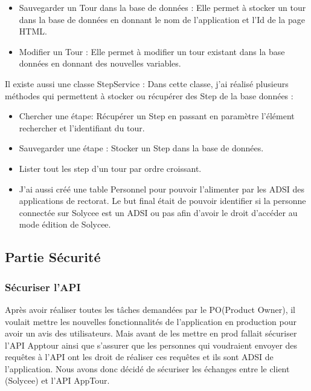 \documentclass[12pt]{article}
\begin{document}
\begin{itemize}
\begin{itemize}
\item Sauvegarder un Tour dans la base de données : Elle permet à stocker un tour dans la base de données en donnant le nom de l'application et l'Id de la page HTML. 

\item Modifier un Tour : Elle permet à modifier un tour existant dans la base données en donnant des nouvelles variables. 
\end{itemize}

Il existe aussi une classe StepService : Dans cette classe, j'ai réalisé plusieurs méthodes qui permettent à stocker ou récupérer des Step de la base données : 
\begin{itemize}

\item  Chercher une étape: Récupérer un Step en passant en paramètre l'élément rechercher et l'identifiant du tour.

\item Sauvegarder une étape : Stocker un Step dans la base de données.

\item Lister tout les step d'un tour par ordre croissant.  


\item J'ai aussi créé une table Personnel pour pouvoir l'alimenter par les ADSI des applications de rectorat. Le but final était de pouvoir identifier si la personne connectée sur Solycee est un ADSI ou pas afin d'avoir le droit d'accéder au mode édition de Solycee. 

\end{itemize}
\end{itemize}
\subsection{Partie Sécurité}

\subsubsection{Sécuriser l'API}

Après avoir réaliser toutes les tâches demandées par le PO(Product Owner), il voulait mettre les nouvelles fonctionnalités de l'application en production pour avoir un avis des utilisateurs. Mais avant de les mettre en prod fallait sécuriser l'API Apptour ainsi que s'assurer que les personnes qui voudraient envoyer des requêtes à l'API ont les droit de réaliser ces requêtes et ils sont ADSI de l'application. Nous avons donc décidé de sécuriser les échanges entre le client (Solycee) et l'API AppTour. 
\end{document}
